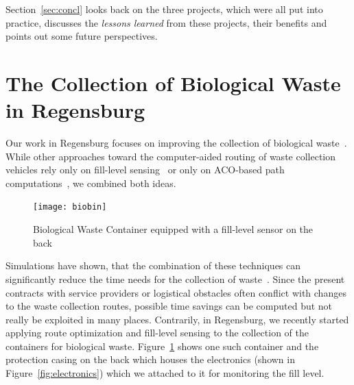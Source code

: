 \documentclass[10pt]{article}
\begin{document}
Section~\ref{sec:concl} looks back on the three projects, which were all 
put into practice, discusses the {\it lessons learned} from these projects,
their benefits and points out some future perspectives.


\section{The Collection of Biological Waste in Regensburg}
\label{sec:Regensburg}

Our work in Regensburg focuses on improving the collection of biological waste~\cite{Burger18}.
While other approaches toward the computer-aided routing of waste collection vehicles 
rely only on fill-level sensing~\cite{LundinOS17} or only on ACO-based path 
computations~\cite{ismail09}, we combined both ideas. 

\begin{figure}[h!]
    \centering
  \texttt{[image: biobin]}
  \caption{Biological Waste Container equipped with a fill-level sensor on the back}
  \label{fig:container}       %
\end{figure}

Simulations have shown, that 
the combination of these techniques can significantly reduce the time needs for the collection
of waste~\cite{Sharmin16}. Since the present contracts with service providers or logistical
obstacles often conflict with changes to the waste collection routes, possible time savings can be 
computed but not really be exploited in many places.
Contrarily, in Regensburg, we recently started applying route optimization and fill-level 
sensing to the collection of the containers for biological waste.
Figure~\ref{fig:container} shows one such container and the protection casing on the
back which houses the electronics (shown in Figure~\ref{fig:electronics}) which we attached 
to it for monitoring the fill level.
\end{document}
